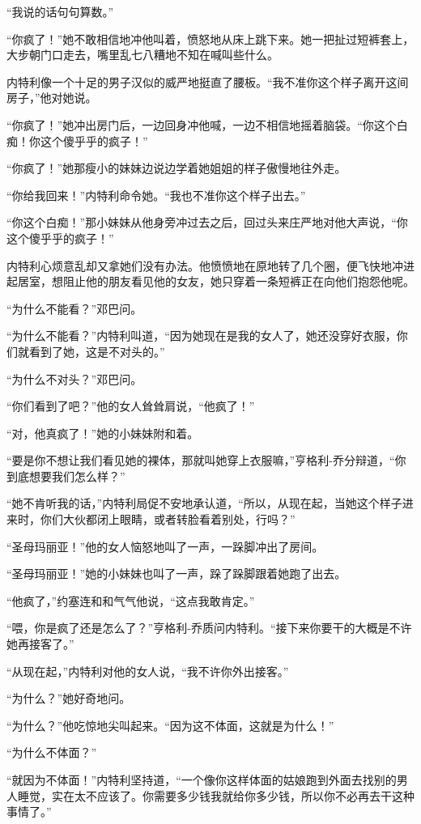     “我说的话句句算数。”

    “你疯了！”她不敢相信地冲他叫着，愤怒地从床上跳下来。她一把扯过短裤套上，大步朝门口走去，嘴里乱七八糟地不知在喊叫些什么。

    内特利像一个十足的男子汉似的威严地挺直了腰板。“我不准你这个样子离开这间房子，”他对她说。

    “你疯了！”她冲出房门后，一边回身冲他喊，一边不相信地摇着脑袋。“你这个白痴！你这个傻乎乎的疯子！”

    “你疯了！”她那瘦小的妹妹边说边学着她姐姐的样子傲慢地往外走。

    “你给我回来！”内特利命令她。“我也不准你这个样子出去。”

    “你这个白痴！”那小妹妹从他身旁冲过去之后，回过头来庄严地对他大声说，“你这个傻乎乎的疯子！”

    内特利心烦意乱却又拿她们没有办法。他愤愤地在原地转了几个圈，便飞快地冲进起居室，想阻止他的朋友看见他的女友，她只穿着一条短裤正在向他们抱怨他呢。

    “为什么不能看？”邓巴问。

    “为什么不能看？”内特利叫道，“因为她现在是我的女人了，她还没穿好衣服，你们就看到了她，这是不对头的。”

    “为什么不对头？”邓巴问。

    “你们看到了吧？”他的女人耸耸肩说，“他疯了！”

    “对，他真疯了！”她的小妹妹附和着。

    “要是你不想让我们看见她的裸体，那就叫她穿上衣服嘛，”亨格利-乔分辩道，“你到底想要我们怎么样？”

    “她不肯听我的话，”内特利局促不安地承认道，“所以，从现在起，当她这个样子进来时，你们大伙都闭上眼睛，或者转脸看着别处，行吗？”

    “圣母玛丽亚！”他的女人恼怒地叫了一声，一跺脚冲出了房间。

    “圣母玛丽亚！”她的小妹妹也叫了一声，跺了跺脚跟着她跑了出去。

    “他疯了，”约塞连和和气气他说，“这点我敢肯定。”

    “喂，你是疯了还是怎么了？”亨格利-乔质问内特利。“接下来你要干的大概是不许她再接客了。”

    “从现在起，”内特利对他的女人说，“我不许你外出接客。”

    “为什么？”她好奇地问。

    “为什么？”他吃惊地尖叫起来。“因为这不体面，这就是为什么！”

    “为什么不体面？”

    “就因为不体面！”内特利坚持道，“一个像你这样体面的姑娘跑到外面去找别的男人睡觉，实在太不应该了。你需要多少钱我就给你多少钱，所以你不必再去干这种事情了。”

